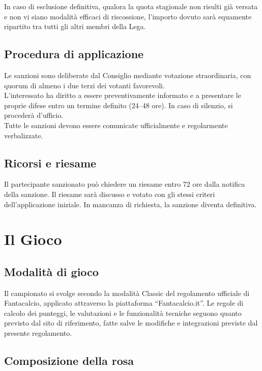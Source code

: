 In caso di esclusione definitiva, qualora la quota stagionale non risulti già versata e non vi siano modalità efficaci di riscossione, l'importo dovuto sarà equamente ripartito tra tutti gli altri membri della Lega.

\section{Procedura di applicazione}
\label{art:3.4}

Le sanzioni sono deliberate dal Consiglio mediante votazione straordinaria, con quorum di almeno i due terzi dei votanti favorevoli.\\
L'interessato ha diritto a essere preventivamente informato e a presentare le proprie difese entro un termine definito (24–48 ore). In caso di silenzio, si procederà d'ufficio.\\
Tutte le sanzioni devono essere comunicate ufficialmente e regolarmente verbalizzate.

\section{Ricorsi e riesame}
\label{art:3.5}

Il partecipante sanzionato può chiedere un riesame entro 72 ore dalla notifica della sanzione. Il riesame sarà discusso e votato con gli stessi criteri dell'applicazione iniziale. In mancanza di richiesta, la sanzione diventa definitiva.


\chapter{Il Gioco}
\label{cap:il-gioco}

\section{Modalità di gioco}
\label{art:4.1}

Il campionato si svolge secondo la modalità Classic del regolamento ufficiale di Fantacalcio, applicato attraverso la piattaforma “Fantacalcio.it”. Le regole di calcolo dei punteggi, le valutazioni e le funzionalità tecniche seguono quanto previsto dal sito di riferimento, fatte salve le modifiche e integrazioni previste dal presente regolamento.

\section{Composizione della rosa}
\label{art:4.2}

